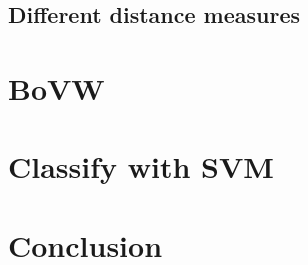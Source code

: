 \documentclass{article}
\begin{document}
\subsection{Different distance measures}



\section{BoVW}


\section{Classify with SVM}


\section{Conclusion}



\newcommand{\doi}[1]{DOI: \href{http://dx.doi.org/#1}{\nolinkurl{#1}}}



\end{document}
